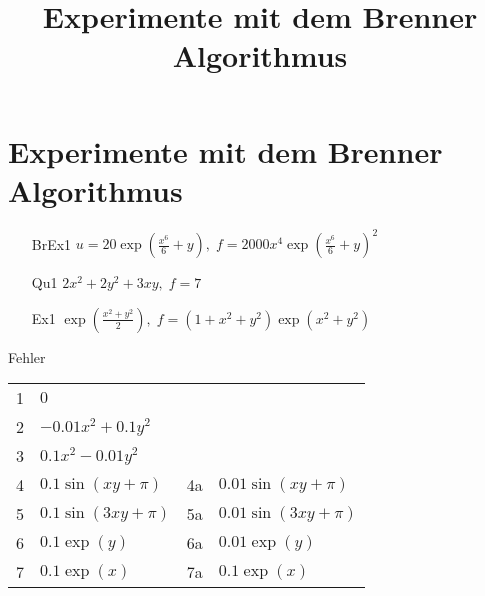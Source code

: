 \documentclass[a4paper,11pt]{article}
\title{Experimente mit dem Brenner Algorithmus}
\begin{document}
\section*{Experimente mit dem Brenner Algorithmus}


\begin{enumerate}
	\item [BrEx1]  $u = 20\exp(\frac {x^6} 6 +y), \; f = 2000 x^4{\exp(\frac {x^6} 6 +y)}^2 $
	\item [Qu1] $2x^2+2y^2+3xy, \; f = 7$
	\item [Ex1] $\exp(\frac{x^2+y^2} 2), \; f= (1+x^2+y^2)\exp(x^2+y^2)$
\end{enumerate}

Fehler

\begin{tabular}{clcl}
	1 & $0$ \\
  	2 & $-0.01x^2+0.1y^2$ \\
	3 & $0.1x^2-0.01y^2$ \\
	4 & $0.1 \sin(xy+\pi)$  & 4a & $0.01\sin(xy+\pi)$ \\
	5 & $0.1\sin(3xy+\pi)$  & 5a & $0.01\sin(3xy+\pi)$ \\
	6 & $0.1\exp(y)$        & 6a & $0.01\exp(y)$ \\
	7 & $0.1\exp(x)$        & 7a & $0.1\exp(x)$
\end{tabular}
\end{document}
